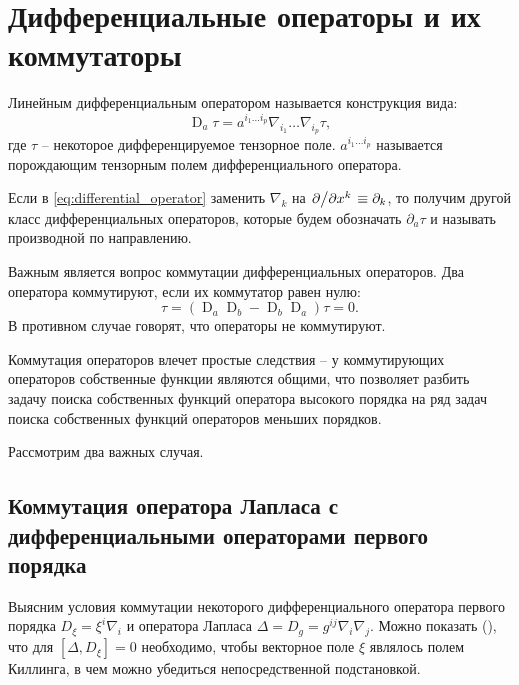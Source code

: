 \documentclass[12pt,a4paper]{article}
\DeclareMathOperator{\D}{D}
\begin{document}

    \section{Дифференциальные операторы и их коммутаторы\label{sec:commutators}}

        Линейным дифференциальным оператором называется конструкция вида:
        \begin{equation}\label{eq:differential_operator}
            \D_a\tau = a^{i_1 \dots i_p} \nabla_{i_1} \dots \nabla_{i_p} \tau ,
        \end{equation}
        где $\tau$ -- некоторое дифференцируемое тензорное поле. $a^{i_1 \dots i_p}$ называется порождающим тензорным полем дифференциального оператора.

        Если в \autoref{eq:differential_operator} заменить $\nabla_k$ на $\pdv*{x^k} \equiv \partial_k$, то получим другой класс дифференциальных операторов, которые будем обозначать $\partial_a\tau$ и называть производной по направлению.

        Важным является вопрос коммутации дифференциальных операторов. Два оператора коммутируют, если их коммутатор равен нулю:
        \begin{equation}
            [\D_a, \D_b]\tau = (\D_a \D_b - \D_b \D_a) \tau = 0 .
        \end{equation}
        В противном случае говорят, что операторы не коммутируют.

        Коммутация операторов влечет простые следствия -- у коммутирующих операторов собственные функции являются общими, что позволяет разбить задачу поиска собственных функций оператора высокого порядка на ряд задач поиска собственных функций операторов меньших порядков.

        Рассмотрим два важных случая.

        \subsection{Коммутация оператора Лапласа с дифференциальными операторами первого порядка}

            Выясним условия коммутации некоторого дифференциального оператора первого порядка $D_\xi = \xi^i \nabla_i$ и оператора Лапласа $\Delta = D_g = g^{ij} \nabla_i \nabla_j$. Можно показать (\cite{differential_operator_commutators}), что для $[\Delta, D_\xi] = 0$ необходимо, чтобы векторное поле $\xi$ являлось полем Киллинга, в чем можно убедиться непосредственной подстановкой.
\end{document}
